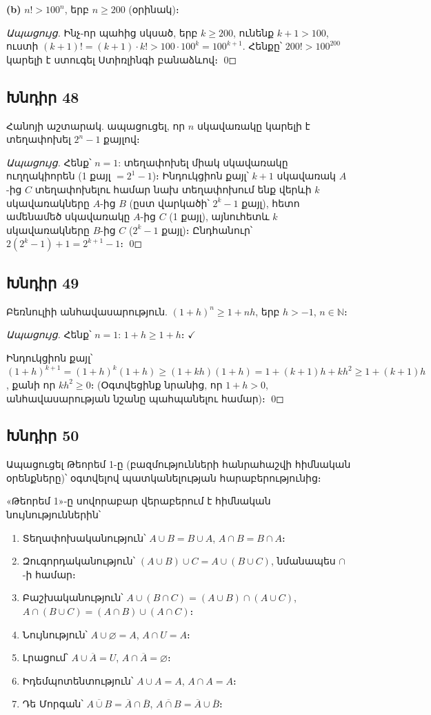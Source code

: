 \textbf{(b)} $n! > 100^n$, երբ $n \ge 200$ (օրինակ)։

\textit{Ապացույց.} Ինչ-որ պահից սկսած, երբ $k \ge 200$, ունենք $k + 1 > 100$, ուստի $(k+1)! = (k+1) \cdot k! > 100 \cdot 100^k = 100^{k+1}$. Հենքը՝ $200! > 100^{200}$ կարելի է ստուգել Ստիռլինգի բանաձևով։ \qed

\subsection*{Խնդիր 48}
Հանոյի աշտարակ. ապացուցել, որ $n$ սկավառակը կարելի է տեղափոխել $2^n - 1$ քայլով։

\textit{Ապացույց.} Հենք՝ $n=1$: տեղափոխել միակ սկավառակը ուղղակիորեն (1 քայլ $= 2^1 - 1$)։
Ինդուկցիոն քայլ՝ $k+1$ սկավառակ $A$-ից $C$ տեղափոխելու համար նախ տեղափոխում ենք վերևի $k$ սկավառակները $A$-ից $B$ (ըստ վարկածի՝ $2^k - 1$ քայլ), հետո ամենամեծ սկավառակը $A$-ից $C$ (1 քայլ), այնուհետև $k$ սկավառակները $B$-ից $C$ ($2^k - 1$ քայլ)։ Ընդհանուր՝ $2(2^k-1)+1 = 2^{k+1}-1$։ \qed

\subsection*{Խնդիր 49}
Բեռնուլիի անհավասարություն. $(1+h)^n \ge 1 + nh$, երբ $h > -1$, $n \in \mathbb{N}$։

\textit{Ապացույց.} Հենք՝ $n=1$: $1+h \ge 1+h$։ $\checkmark$

Ինդուկցիոն քայլ՝ $(1+h)^{k+1} = (1+h)^k(1+h) \ge (1+kh)(1+h) = 1 + (k+1)h + kh^2 \ge 1 + (k+1)h$,
քանի որ $kh^2 \ge 0$։ (Օգտվեցինք նրանից, որ $1+h > 0$, անհավասարության նշանը պահպանելու համար)։ \qed

\subsection*{Խնդիր 50}
Ապացուցել Թեորեմ 1-ը (բազմությունների հանրահաշվի հիմնական օրենքները)՝ օգտվելով պատկանելության հարաբերությունից։

«Թեորեմ 1»-ը սովորաբար վերաբերում է հիմնական նույնություններին՝
\begin{enumerate}
  \item Տեղափոխականություն՝ $A \cup B = B \cup A$, $A \cap B = B \cap A$։
  \item Զուգորդականություն՝ $(A \cup B) \cup C = A \cup (B \cup C)$, նմանապես $\cap$-ի համար։
  \item Բաշխականություն՝ $A \cup (B \cap C) = (A \cup B) \cap (A \cup C)$, $A \cap (B \cup C) = (A \cap B) \cup (A \cap C)$։
  \item Նույնություն՝ $A \cup \varnothing = A$, $A \cap U = A$։
  \item Լրացում՝ $A \cup \overline{A} = U$, $A \cap \overline{A} = \varnothing$։
  \item Իդեմպոտենտություն՝ $A \cup A = A$, $A \cap A = A$։
  \item Դե Մորգան՝ $\overline{A \cup B} = \overline{A} \cap \overline{B}$, $\overline{A \cap B} = \overline{A} \cup \overline{B}$։
\end{enumerate}

